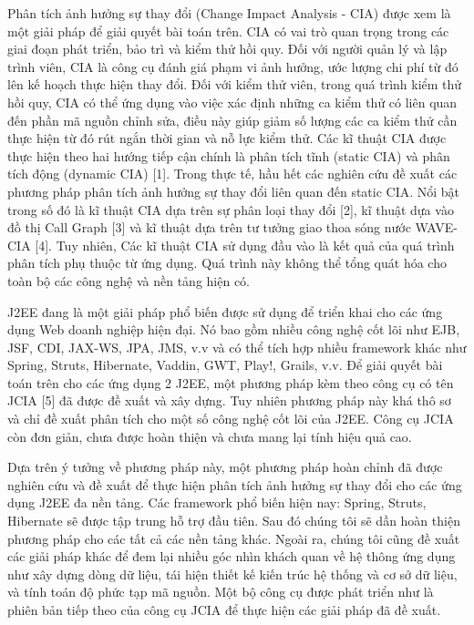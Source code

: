 \documentclass[12pt]{report}
\begin{document}
Phân tích ảnh hưởng sự thay đổi (Change Impact Analysis - CIA) được xem là một
giải pháp để giải quyết bài toán trên. CIA có vai trò quan trọng trong các giai đoạn phát
triển, bảo trì và kiểm thử hồi quy. Đối với người quản lý và lập trình viên, CIA là công cụ
đánh giá phạm vi ảnh hưởng, ước lượng chi phí từ đó lên kế hoạch thực hiện thay đổi.
Đối với kiểm thử viên, trong quá trình kiểm thử hồi quy, CIA có thể ứng dụng vào việc
xác định những ca kiểm thử có liên quan đến phần mã nguồn chỉnh sửa, điều này giúp
giảm số lượng các ca kiểm thử cần thực hiện từ đó rút ngắn thời gian và nỗ lực kiểm thử.
Các kĩ thuật CIA được thực hiện theo hai hướng tiếp cận chính là phân tích tĩnh (static
CIA) và phân tích động (dynamic CIA) [1]. Trong thực tế, hầu hết các nghiên cứu đề xuất
các phương pháp phân tích ảnh hưởng sự thay đổi liên quan đến static CIA. Nổi bật trong
số đó là kĩ thuật CIA dựa trên sự phân loại thay đổi [2], kĩ thuật dựa vào đồ thị Call
Graph [3] và kĩ thuật dựa trên tư tưởng giao thoa sóng nước WAVE-CIA [4]. Tuy nhiên,
Các kĩ thuật CIA sử dụng đầu vào là kết quả của quá trình phân tích phụ thuộc từ ứng
dụng. Quá trình này không thể tổng quát hóa cho toàn bộ các công nghệ và nền tảng hiện
có.

J2EE đang là một giải pháp phổ biến được sử dụng để triển khai cho các ứng dụng
Web doanh nghiệp hiện đại. Nó bao gồm nhiều công nghệ cốt lõi như EJB, JSF, CDI,
JAX-WS, JPA, JMS, v.v và có thể tích hợp nhiều framework khác như Spring, Struts,
Hibernate, Vaddin, GWT, Play!, Grails, v.v. Để giải quyết bài toán trên cho các ứng dụng 
2
J2EE, một phương pháp kèm theo công cụ có tên JCIA [5] đã được đề xuất và xây dựng.
Tuy nhiên phương pháp này khá thô sơ và chỉ đề xuất phân tích cho một số công nghệ cốt
lõi của J2EE. Công cụ JCIA còn đơn giản, chưa được hoàn thiện và chưa mang lại tính
hiệu quả cao.

Dựa trên ý tưởng về phương pháp này, một phương pháp hoàn chỉnh đã được nghiên
cứu và đề xuất để thực hiện phân tích ảnh hưởng sự thay đổi cho các ứng dụng J2EE đa
nền tảng. Các framework phổ biến hiện nay: Spring, Struts, Hibernate sẽ được tập trung
hỗ trợ đầu tiên. Sau đó chúng tôi sẽ dần hoàn thiện phương pháp cho các tất cả các nền
tảng khác. Ngoài ra, chúng tôi cũng đề xuất các giải pháp khác để đem lại nhiều góc nhìn
khách quan về hệ thông ứng dụng như xây dựng dòng dữ liệu, tái hiện thiết kế kiến trúc
hệ thống và cơ sở dữ liệu, và tính toán độ phức tạp mã nguồn. Một bộ công cụ được phát
triển như là phiên bản tiếp theo của công cụ JCIA để thực hiện các giải pháp đã đề xuất.
\end{document}
